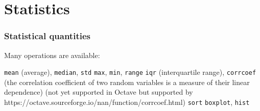 \documentclass[11pt]{beamer}
\begin{document}

\section{Statistics}

\begin{frame}[fragile]
	\frametitle{Statistical quantities}
	
	\begin{enumerate}
		\myitem  Many operations are available:
		\begin{enumerate}
			\mysubitem  \texttt{mean} (average), \texttt{median}, \texttt{std}
			\mysubitem  \texttt{max}, \texttt{min}, \texttt{range}
			\mysubitem  \texttt{iqr} (interquartile range), \texttt{corrcoef} (the correlation coefficient of two random variables is a measure of their linear dependence) (not yet supported in Octave but supported by https://octave.sourceforge.io/nan/function/corrcoef.html)
			\mysubitem  \texttt{sort}
			\mysubitem  \texttt{boxplot}, \texttt{hist}
		\end{enumerate}
	\end{enumerate}
\end{frame}
\end{document}
